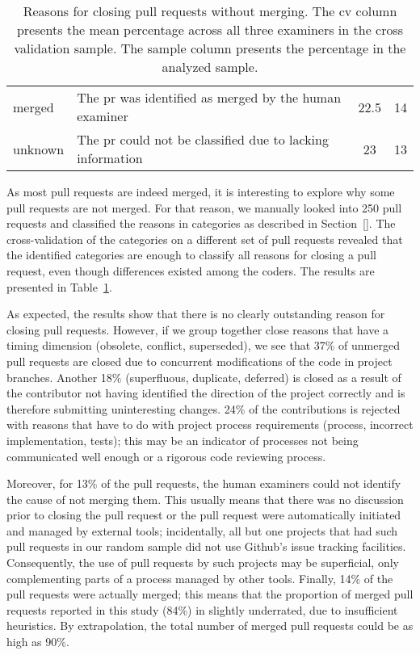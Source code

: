 \documentclass{sig-alternate}
\begin{document}
\begin{table}
\begin{small}
\begin{tabular}{p{6em}p{14em}cc}
    \hline 
    \textsf{merged} & The {\sc pr} was identified as merged by the human
    examiner & 22.5 & 14\\

    \textsf{unknown} & The {\sc pr} could not be classified due to lacking
    information & 23 & 13 \\

    \hline
  \end{tabular}
\end{small}
\caption{Reasons for closing pull requests without merging. The {\sc cv} column
presents the mean percentage across all three examiners in the cross validation sample. The sample column presents the percentage in the analyzed sample.}
\label{tab:unmerged}
\end{table}

As most pull requests are indeed merged, it is interesting to explore why some
pull requests are not merged. For that reason, we manually looked into 
250 pull requests and classified the reasons in categories as described in
Section~\ref{}. The cross-validation of the categories on a different set of
pull requests 
revealed that the identified categories are enough to classify all reasons for closing a pull request, even though differences existed among the coders.
The results are presented in Table~\ref{tab:unmerged}. 

As expected, the results show that there is no clearly outstanding reason for closing pull requests. However, if we group together close reasons that have a timing dimension (\textsf{obsolete}, \textsf{conflict}, \textsf{superseded}), we
see that 37\% of unmerged pull requests are closed due to concurrent
modifications of the code in project branches.
Another 18\% (\textsf{superfluous}, \textsf{duplicate}, \textsf{deferred}) is closed as a result of the contributor not having identified the direction of the project correctly and is therefore submitting uninteresting changes. 24\% of the
contributions is rejected with reasons that have to do with project process requirements (\textsf{process}, \textsf{incorrect implementation}, \textsf{tests}); this may be an indicator of processes not being communicated well enough or a rigorous code reviewing process.

Moreover, for 13\% of the pull requests, the human examiners could not identify
the cause of not merging them.  This usually means that there was no discussion
prior to closing the pull request or the pull request were automatically
initiated and managed by external tools; incidentally, all but one projects that
had such pull requests in our random sample did not use Github's issue tracking
facilities. Consequently, the use of pull requests by such projects may be
superficial, only complementing parts of a process managed by other tools.
Finally, 14\% of the pull requests were actually merged; this means that the
proportion of merged pull requests reported in this study (84\%) in slightly
underrated, due to insufficient heuristics. By extrapolation, the total number
of merged pull requests could be as high as 90\%.
\end{document}
